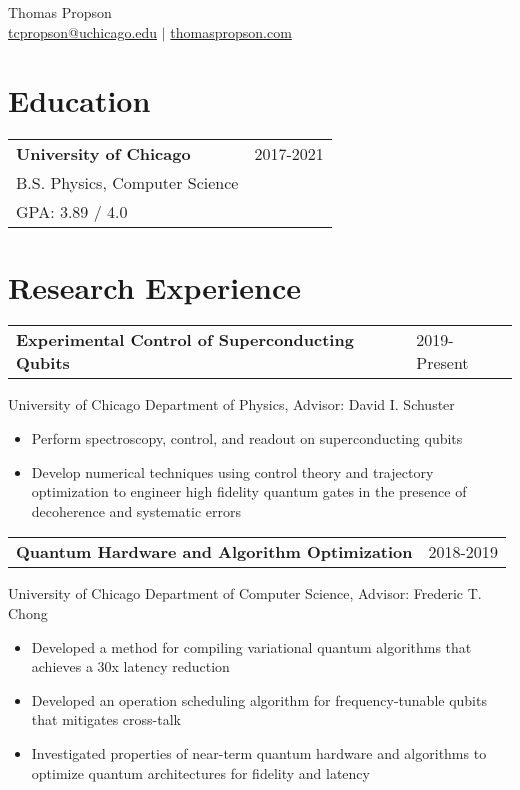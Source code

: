 \documentclass[letterpaper, 12pt]{article}
\begin{document}
\begin{center}
{\large Thomas Propson} \\[5pt]
\href{mailto:tcpropson@uchicago.edu}{tcpropson@uchicago.edu} $\vert$
\href{https://thomaspropson.com}{thomaspropson.com}
\end{center}


\flushleft

\section{Education}
\begin{tabular}{@{} L{12cm} @{} R{4.51cm} @{}}
  \textbf{University of Chicago} & 2017-2021\\
  B.S. Physics, Computer Science\\
  GPA: 3.89 / 4.0 &\\
\end{tabular}

\section{Research Experience}
\begin{tabular}{@{} L{12cm} @{} R{4.51cm} @{}}
  \textbf{Experimental Control of Superconducting Qubits} & 2019-Present\\
\end{tabular}
University of Chicago Department of Physics, Advisor: David I. Schuster\\
\begin{itemize}
  \item Perform spectroscopy, control, and readout on superconducting qubits
  \item Develop numerical techniques using control theory and trajectory optimization
    to engineer high fidelity quantum gates in the presence of decoherence and systematic errors
\end{itemize}

\begin{tabular}{@{} L{12cm} @{} R{4.51cm} @{}}
  \textbf{Quantum Hardware and Algorithm Optimization} & 2018-2019\\
\end{tabular}
University of Chicago Department of Computer Science, Advisor: Frederic T. Chong
\begin{itemize}
  \item Developed a method for compiling variational quantum algorithms that achieves a 30x latency reduction
  \item Developed an operation scheduling algorithm for frequency-tunable qubits that mitigates cross-talk
  \item Investigated properties of near-term quantum hardware and algorithms
    to optimize quantum architectures for fidelity and latency
\end{itemize}
\end{document}
